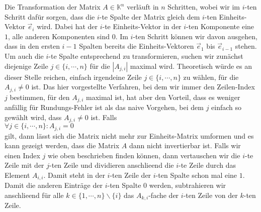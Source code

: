 Die Transformation der Matrix $A \in \mathbb{K}^n$ verl\"{a}uft in $n$ Schritten, wobei wir im $i$-ten
Schritt daf\"{u}r sorgen, dass die $i$-te Spalte der Matrix gleich dem $i$-ten Einheits-Vektor
$\vec{e}_i$ wird.  Dabei hat der $i$-te Einheits-Vektor in der $i$-ten Komponente eine $1$, alle
anderen Komponenten sind $0$.  Im $i$-ten Schritt k\"{o}nnen wir davon ausgehen, dass in den ersten $i-1$
Spalten bereits die Einheits-Vektoren $\vec{e}_1$ bis $\vec{e}_{i-1}$ stehen.
Um auch die $i$-te Spalte entsprechend zu transformieren, suchen wir zun\"{a}chst diejenige Zeile 
$j \in \{i, \cdots, n\}$ f\"{u}r die $|A_{j,i}|$ maximal wird.  Theoretisch w\"{u}rde es an dieser Stelle
reichen, einfach irgendeine Zeile $j \in \{i, \cdots, n\}$ zu w\"{a}hlen, f\"{u}r die $A_{j,i} \not= 0$ 
ist.  Das hier vorgestellte Verfahren, bei dem wir immer den Zeilen-Index $j$ bestimmen, f\"{u}r den
$A_{j,i}$ maximal ist, hat aber den Vorteil, dass es weniger anf\"{a}llig f\"{u}r Rundungs-Fehler ist als
das naive Vorgehen, bei dem $j$ einfach so gew\"{a}hlt wird, dass $A_{j,i} \not= 0$ ist.  Falls 
\\[0.2cm]
\hspace*{1.3cm}
$\forall j \in \{i, \cdots, n\} : A_{j,i} = 0$ 
\\[0.2cm]
gilt, dann l\"{a}sst sich die Matrix nicht mehr zur Einheits-Matrix umformen und es kann gezeigt werden,
dass die Matrix $A$ dann nicht invertierbar ist.  Falls wir einen Index $j$ wie oben beschrieben
finden k\"{o}nnen, dann vertauschen wir die $i$-te Zeile mit der $j$-ten Zeile und dividieren
anschlie\3end die $i$-te Zeile durch das Element $A_{i,i}$.  Damit steht in der $i$-ten Zeile der
$i$-ten Spalte schon mal eine $1$.  Damit die anderen Eintr\"{a}ge der $i$-ten Spalte $0$ werden,
subtrahieren wir anschlie\3end f\"{u}r alle $k \in \{ 1, \cdots, n \} \backslash \{i\}$ das $A_{k,i}$-fache der $i$-ten
Zeile von der $k$-ten Zeile.


